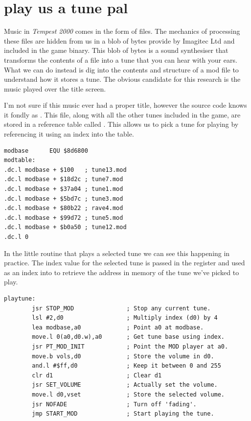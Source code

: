 \chapter{play us a tune pal}
\label{sec:listing}
\lstset{style=68KStyle}

Music in \textit{Tempest 2000} comes in the form of  files. The mechanics of
processing these files are hidden from us in a blob of bytes provide by Imagitec Ltd
and included in the game binary. This blob of bytes is a sound synthesiser that transforms
the contents of a  file into a tune that you can hear with your ears. What we can
do instead is dig into the contents and structure of a mod file to understand how it stores
a tune. The obvious candidate for this research is the music played over the title screen.

I'm not sure if this music ever had a proper title, however the source code knows it fondly
as . This file, along with all the other tunes included in the game, are
stored in a reference table called . This allows us to pick a tune for playing
by referencing it using an index into the table. 

\begin{lstlisting}
modbase      EQU $8d6800
modtable:
.dc.l modbase + $100   ; tune13.mod
.dc.l modbase + $18d2c ; tune7.mod
.dc.l modbase + $37a04 ; tune1.mod
.dc.l modbase + $5bd7c ; tune3.mod
.dc.l modbase + $80b22 ; rave4.mod
.dc.l modbase + $99d72 ; tune5.mod
.dc.l modbase + $b0a50 ; tune12.mod
.dc.l 0
\end{lstlisting}

In the little routine that plays a selected tune we can see this happening in practice. The
index value for the selected tune is passed in the  register and used as an index
into  to retrieve the address in memory of the tune we've picked to play.
\clearpage
\begin{lstlisting}
playtune:
        jsr STOP_MOD               ; Stop any current tune.
        lsl #2,d0                  ; Multiply index (d0) by 4
        lea modbase,a0             ; Point a0 at modbase.
        move.l 0(a0,d0.w),a0       ; Get tune base using index.
        jsr PT_MOD_INIT            ; Point the MOD player at a0.
        move.b vols,d0             ; Store the volume in d0.
        and.l #$ff,d0              ; Keep it between 0 and 255
        clr d1                     ; Clear d1
        jsr SET_VOLUME             ; Actually set the volume.
        move.l d0,vset             ; Store the selected volume.
        jsr NOFADE                 ; Turn off 'fading'.
        jmp START_MOD              ; Start playing the tune.
\end{lstlisting}

